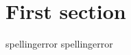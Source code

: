 \documentclass{article}
\newcommand\mygls\gls
\begin{document}
\section{First section}
\gls{spellingerror}
\mygls{spellingerror}
\end{document}

